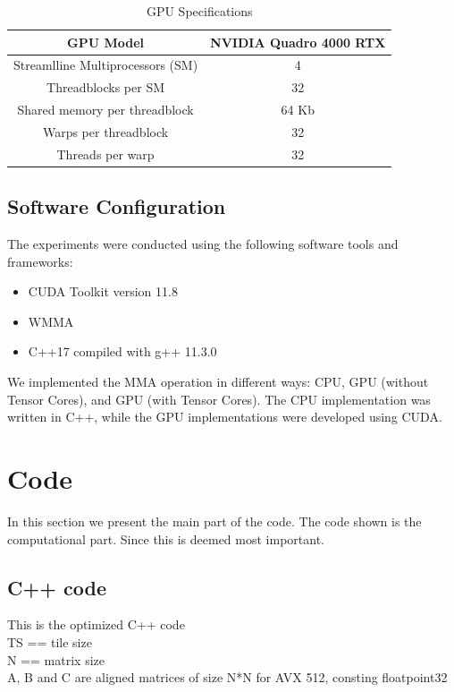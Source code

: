 \documentclass[conference]{IEEEtran}
\begin{document}
  \begin{table}[htbp]
  \caption{GPU Specifications\cite{Voltatuningguide}}
  \centering
    \begin{tabular}{|c|c|}
    \hline
    GPU Model & NVIDIA Quadro 4000 RTX \\
    \hline
    Streamlline Multiprocessors (SM) & 4 \\
    \hline
    Threadblocks per SM & 32 \\
    \hline
    Shared memory per threadblock & 64 Kb \\
    \hline
    Warps per threadblock & 32 \\
    \hline
    Threads per warp & 32 \\
    \hline
  \end{tabular}
  \end{table}
  
  \subsection{Software Configuration}\label{sec:software-configuration}
  
  The experiments were conducted using the following software tools and frameworks:
  
  \begin{itemize}
    \item CUDA Toolkit version 11.8
    \item WMMA
    \item C++17 compiled with g++ 11.3.0
  \end{itemize}
  
  We implemented the MMA operation in different ways: CPU, GPU (without Tensor Cores), and GPU (with Tensor Cores). 
  The CPU implementation was written in C++, while the GPU implementations were developed using CUDA.

  
  \section{Code}
  In this section we present the main part of the code. The code shown is the computational part. Since this is
  deemed most important.

  \subsection{C++ code}\label{sec:CppCode}
  This is the optimized C++ code\\
  TS == tile size \\
  N == matrix size \\
  A, B and C are aligned matrices of size N*N for AVX 512, consting floatpoint32 
  
\end{document}
